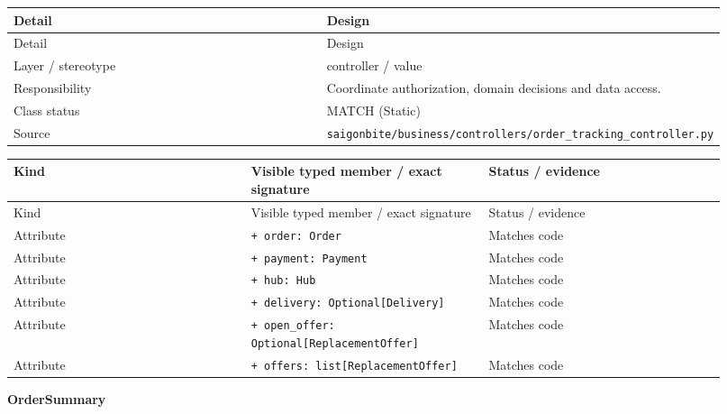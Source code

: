 \begin{longtable}{>{\raggedright\arraybackslash}p{0.4600\linewidth}>{\raggedright\arraybackslash}p{0.4600\linewidth}}
Detail & Design \\
\hline\endfirsthead
Detail & Design \\
\hline\endhead
Layer / stereotype & controller / \guillemotleft{}value\guillemotright{} \\
Responsibility & Coordinate authorization, domain decisions and data access. \\
Class status & MATCH (Static) \\
Source & \texttt{saigonbite/\allowbreak{}business/\allowbreak{}controllers/\allowbreak{}order\_\allowbreak{}tracking\_\allowbreak{}controller.\allowbreak{}py} \\
\end{longtable}
\begin{longtable}{>{\raggedright\arraybackslash}p{0.3067\linewidth}>{\raggedright\arraybackslash}p{0.3067\linewidth}>{\raggedright\arraybackslash}p{0.3067\linewidth}}
Kind & Visible typed member / exact signature & Status / evidence \\
\hline\endfirsthead
Kind & Visible typed member / exact signature & Status / evidence \\
\hline\endhead
Attribute & \texttt{+ order: Order} & Matches code \\
Attribute & \texttt{+ payment: Payment} & Matches code \\
Attribute & \texttt{+ hub: Hub} & Matches code \\
Attribute & \texttt{+ delivery: Optional[Delivery]} & Matches code \\
Attribute & \texttt{+ open\_\allowbreak{}offer: Optional[ReplacementOffer]} & Matches code \\
Attribute & \texttt{+ offers: list[ReplacementOffer]} & Matches code \\
\end{longtable}
\textbf{OrderSummary}

